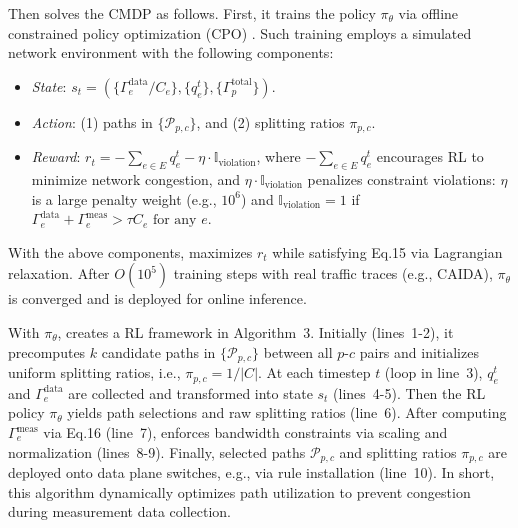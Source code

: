 Then \sysname solves the CMDP as follows. First, it trains the policy $\pi_\theta$ via offline constrained policy optimization (CPO) \cite{achiam2017constrained}. Such training employs a simulated network environment with the following components: 
\begin{itemize}[leftmargin=*,noitemsep]
\item \textit{State}: $s_t = \left( \{ \Gamma_e^{\text{data}}/C_e \}, \{q_e^t\}, \{\Gamma_p^{\text{total}}\} \right)$.
\item \textit{Action}: (1) paths in $\{\mathcal{P}_{p,c}\}$, and (2) splitting ratios $\pi_{p,c}$.
\item \textit{Reward}: $r_t = -\sum_{e \in E} q_e^t - \eta \cdot \mathbb{I}_{\text{violation}}$, where $-\sum_{e \in E} q_e^t$ encourages RL to minimize network congestion, and $\eta \cdot \mathbb{I}_{\text{violation}}$ penalizes constraint violations: $\eta$ is a large penalty weight (e.g., $10^6$) and $\mathbb{I}_{\text{violation}}=1$ if $\Gamma_e^{\text{data}} + \Gamma_e^{\text{meas}} > \tau C_e \text{ for any } e$. 
\end{itemize}

\noindent With the above components, \sysname maximizes $r_t$ while satisfying Eq.15 via Lagrangian relaxation. After $O(10^5)$ training steps with real traffic traces (e.g., CAIDA), $\pi_\theta$ is converged and is deployed for online inference.

With $\pi_\theta$, \sysname creates a RL framework in Algorithm~3. Initially (lines~1-2), it precomputes $k$ candidate paths in $\{\mathcal{P}_{p,c}\}$ between all $p$-$c$ pairs and initializes uniform splitting ratios, i.e., $\pi_{p,c} = 1/|C|$. At each timestep $t$ (loop in line~3), $q_e^t$ and $\Gamma_e^{\text{data}}$ are collected and transformed into state $s_t$ (lines~4-5). Then the RL policy $\pi_\theta$ yields path selections and raw splitting ratios (line~6). 
After computing $\Gamma_e^{\text{meas}}$ via Eq.16 (line~7), \sysname enforces bandwidth constraints via scaling and normalization (lines~8-9). 
Finally, selected paths $\mathcal{P}_{p,c}$ and splitting ratios $\pi_{p,c}$ are deployed onto data plane switches, e.g., via rule installation (line~10). In short, this algorithm dynamically optimizes path utilization to prevent congestion during measurement data collection.


